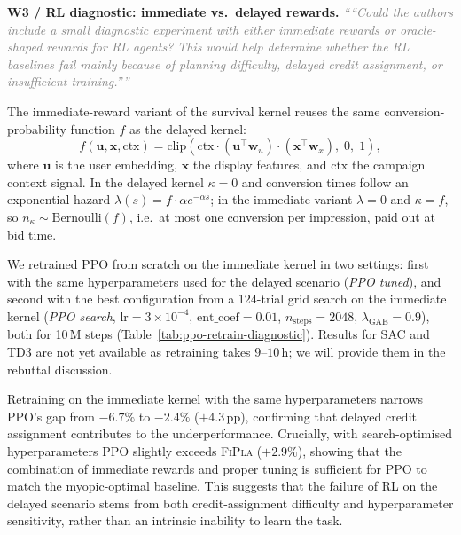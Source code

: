 \documentclass[11pt]{article}
\newcommand{\reviewer}[1]{\textit{\textcolor{gray}{``#1''}}}
\begin{document}
\noindent\textbf{W3 / RL diagnostic: immediate vs.\ delayed rewards.}\quad
\reviewer{``Could the authors include a small diagnostic experiment with either
immediate rewards or oracle-shaped rewards for RL agents?  This would help
determine whether the RL baselines fail mainly because of planning difficulty,
delayed credit assignment, or insufficient training.''}

The immediate-reward variant of the survival kernel reuses the same
conversion-probability function $f$ as the delayed kernel:
%
\begin{equation}
  f(\mathbf{u},\mathbf{x},\mathrm{ctx})
    = \mathrm{clip}\!\left(
        \mathrm{ctx}
        \cdot (\mathbf{u}^{\top}\mathbf{w}_u)
        \cdot (\mathbf{x}^{\top}\mathbf{w}_x),\;0,\;1
      \right),
  \label{eq:f}
\end{equation}
%
where $\mathbf{u}$ is the user embedding, $\mathbf{x}$ the display features,
and $\mathrm{ctx}$ the campaign context signal.
In the delayed kernel $\kappa\!=\!0$ and conversion times follow an exponential
hazard $\lambda(s)=f\cdot\alpha e^{-\alpha s}$; in the immediate variant
$\lambda\!=\!0$ and $\kappa\!=\!f$, so $n_\kappa\!\sim\!\mathrm{Bernoulli}(f)$,
i.e.\ at most one conversion per impression, paid out at bid time.

We retrained \textsc{PPO} from scratch on the immediate kernel in two settings:
first with the same hyperparameters used for the delayed scenario
(\textit{PPO tuned}), and second with the best configuration from a 124-trial
grid search on the immediate kernel (\textit{PPO search},
$\mathrm{lr}{=}3\!\times\!10^{-4}$, $\mathrm{ent\_coef}{=}0.01$,
$n_\mathrm{steps}{=}2048$, $\lambda_\mathrm{GAE}{=}0.9$), both for 10\,M steps
(Table~\ref{tab:ppo-retrain-diagnostic}).
Results for \textsc{SAC} and \textsc{TD3} are not yet available as retraining
takes $9$--$10$\,h; we will provide them in the rebuttal discussion.

Retraining on the immediate kernel with the same hyperparameters narrows
\textsc{PPO}'s gap from $-6.7\%$ to $-2.4\%$ ($+4.3$\,pp), confirming that
delayed credit assignment contributes to the underperformance.
Crucially, with search-optimised hyperparameters \textsc{PPO} slightly exceeds
\textsc{FiPla} ($+2.9\%$), showing that the combination of immediate rewards
and proper tuning is sufficient for \textsc{PPO} to match the myopic-optimal
baseline.
This suggests that the failure of RL on the delayed scenario stems from both
credit-assignment difficulty and hyperparameter sensitivity, rather than an
intrinsic inability to learn the task.
\end{document}

